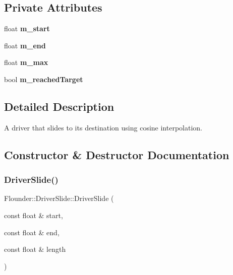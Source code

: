 \subsection*{Private Attributes}
\begin{DoxyCompactItemize}
\item 
\mbox{\label{class_flounder_1_1_driver_slide_a0f64cafffebe7852d3567ac0e89403d2}} 
float {\bfseries m\+\_\+start}
\item 
\mbox{\label{class_flounder_1_1_driver_slide_a4bbaac98e49f66d8e5a3cdc741fbb512}} 
float {\bfseries m\+\_\+end}
\item 
\mbox{\label{class_flounder_1_1_driver_slide_ad7f4f0b16588995124f38f4bfe41649e}} 
float {\bfseries m\+\_\+max}
\item 
\mbox{\label{class_flounder_1_1_driver_slide_a172621882fdf2827a66e9101eb67588e}} 
bool {\bfseries m\+\_\+reached\+Target}
\end{DoxyCompactItemize}


\subsection{Detailed Description}
A driver that slides to its destination using cosine interpolation. 



\subsection{Constructor \& Destructor Documentation}
\mbox{\label{class_flounder_1_1_driver_slide_ab0da83a97d2f15f50900afa16c0ec965}} 
\subsubsection{\texorpdfstring{Driver\+Slide()}{DriverSlide()}}
{\footnotesize\ttfamily Flounder\+::\+Driver\+Slide\+::\+Driver\+Slide (\begin{DoxyParamCaption}\item[{const float \&}]{start,  }\item[{const float \&}]{end,  }\item[{const float \&}]{length }\end{DoxyParamCaption})}



